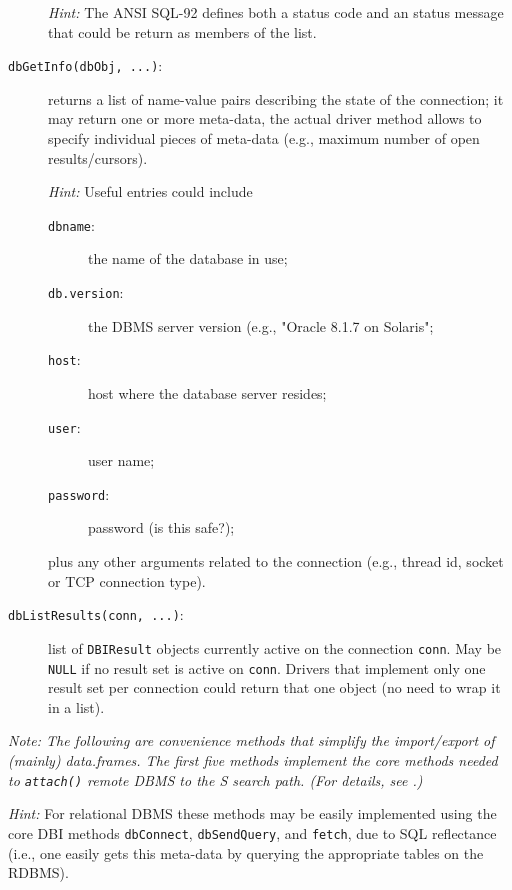 \documentclass[graphics,times,psfig,dvips,hyper]{article}
\newcommand{\sfun}[1]{\mbox{\tt #1()}}  %
\newcommand{\sobj}[1]{\mbox{\tt #1}}    %
\newcommand{\smethod}[1]{\mbox{\tt #1}} %
\begin{document}
\begin{description}
  \emph{Hint:} The ANSI SQL-92 defines both a status code and an
  status message that could be return as members of the list.

\item[\smethod{dbGetInfo(dbObj, ...)}:]
  returns a list of name-value pairs describing the state of the
  connection;  it may return one or more meta-data, the actual driver
  method allows to specify individual pieces of meta-data (e.g., 
  maximum number of open results/cursors).

  \emph{Hint:} Useful entries could include 
  \begin{description} 
  \item[\sobj{dbname}:] the name of the database in use; 
  \item[\sobj{db.version}:] the DBMS server version (e.g., 
  "Oracle 8.1.7 on Solaris"; 
  \item[\sobj{host}:] host where the database server resides; 
  \item[\sobj{user}:] user name;
  \item[\sobj{password}:] password (is this safe?);
  \end{description}
  plus any other arguments related to the connection (e.g., thread id,
  socket or TCP connection type).

\item[\smethod{dbListResults(conn, ...)}:]
  list of \sobj{DBIResult} objects currently active on the connection
  \sobj{conn}.  May be \sobj{NULL} if no result set is active
  on \sobj{conn}.  Drivers that implement only one result set per
  connection could return that one object (no need to wrap it in
  a list).

\end{description}

\emph{Note: The following are convenience methods that simplify
  the import/export of (mainly) data.frames.  The first five
  methods implement the core methods needed to \sfun{attach}
  remote DBMS to the S search path. (For details, see
  \cite{data-management:1991,database-classes:1999}.)
}

\emph{Hint:} For relational DBMS these methods may be easily implemented 
  using the core DBI methods \smethod{dbConnect}, \smethod{dbSendQuery}, 
  and \smethod{fetch}, due to SQL reflectance (i.e., one easily gets
  this meta-data by querying the appropriate tables on the RDBMS).
\end{document}

